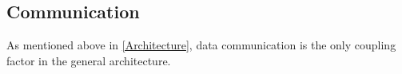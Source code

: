 \subsection{Communication}
As mentioned above in \ref{Architecture}, data communication is the only coupling factor in the general architecture.


